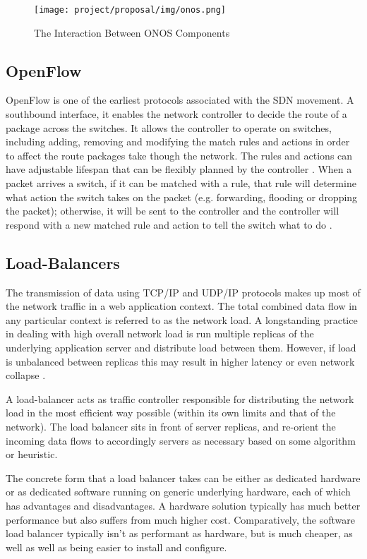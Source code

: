 \begin{figure}[H]
    \centering
    \texttt{[image: project/proposal/img/onos.png]}
    \caption{The Interaction Between ONOS Components \cite{onosAPI}}
    \label{fig:onos}
\end{figure}

\subsection{OpenFlow}
OpenFlow is one of the earliest protocols associated with the SDN movement. A southbound interface, it enables the network controller to decide the route of a package across the switches. It allows the controller to operate on switches, including adding, removing and modifying the match rules and actions in order to affect the route packages take though the network. The rules and actions can have adjustable lifespan that can be flexibly planned by the controller \cite{OpenFlow}. 
When a packet arrives a switch, if it can be matched with a rule, that rule will determine what action the switch takes on the packet (e.g. forwarding, flooding or dropping the packet); otherwise, it will be sent to the controller and the controller will respond with a new matched rule and action to tell the switch what to do \cite{OpenFlow}.

\subsection{Load-Balancers}

The transmission of data using TCP/IP and UDP/IP protocols makes up most of the network traffic in a web application context. The total combined data flow in any particular context is referred to as the network load. A longstanding practice in dealing with high overall network load is run multiple replicas of the underlying application server and distribute load between them. However, if load is unbalanced between replicas this may result in higher latency or even network collapse \cite{LoadBalancer}.

A load-balancer acts as traffic controller responsible for distributing the network load in the most efficient way possible (within its own limits and that of the network). The load balancer sits in front of server replicas, and re-orient the incoming data flows to accordingly servers as necessary based on some algorithm or heuristic. \cite{loadBalancingAlgorithms}

The concrete form that a load balancer takes can be either as dedicated hardware or as dedicated software running on generic underlying hardware, each of which has advantages and disadvantages. A hardware solution typically has much better performance but also suffers from much higher cost. Comparatively, the software load balancer typically isn't as performant as hardware, but is much cheaper, as well as well as being easier to install and configure.

